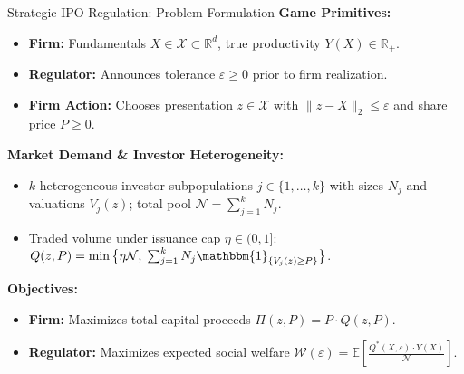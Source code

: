 \documentclass[aspectratio=169, 11pt, t, xcolor=table]{beamer}
\newcommand{\E}{\mathbb{E}}
\newcommand{\R}{\mathbb{R}}
\begin{document}
\begin{frame}{Strategic IPO Regulation: Problem Formulation}
\small
\textbf{Game Primitives:}
\begin{itemize}\itemsep=0.5pt
  \footnotesize
  \item \textbf{Firm:} Fundamentals $X \in \mathcal{X} \subset \R^d$, true productivity $Y(X) \in \R_+$.
  \item \textbf{Regulator:} Announces tolerance $\varepsilon \ge 0$ prior to firm realization.
  \item \textbf{Firm Action:} Chooses presentation $z \in \mathcal{X}$ with $\|z - X\|_2 \le \varepsilon$ and share price $P \ge 0$.
\end{itemize}

\vspace{0.1em}
\textbf{Market Demand \& Investor Heterogeneity:}
\begin{itemize}\itemsep=0.5pt
  \footnotesize
  \item $k$ heterogeneous investor subpopulations $j \in \{1, \dots, k\}$ with sizes $N_j$ and valuations $V_j(z)$; total pool $\mathcal{N} = \sum_{j=1}^k N_j$.
  \item Traded volume under issuance cap $\eta \in (0,1]$:
  $Q(z, P) = \min\big\{\eta\mathcal{N},\; \sum_{j=1}^k N_j \mathbbm{1}_{\{V_j(z) \ge P\}}\big\}$.
\end{itemize}

\vspace{0.1em}
\textbf{Objectives:}
\begin{itemize}\itemsep=0.5pt
  \footnotesize
  \item \textbf{Firm:} Maximizes total capital proceeds $\Pi(z, P) = P \cdot Q(z, P)$.
  \item \textbf{Regulator:} Maximizes expected social welfare $\mathcal{W}(\varepsilon) = \E\left[ \frac{Q^*(X, \varepsilon) \cdot Y(X)}{\mathcal{N}} \right]$.
\end{itemize}
\end{frame}
\end{document}
